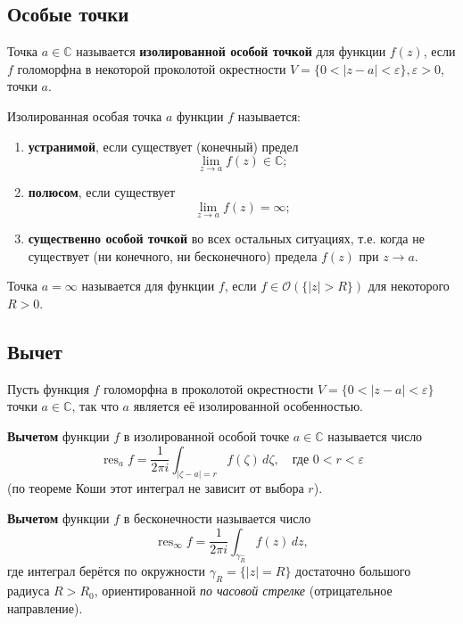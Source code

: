 \subsection{Особые точки}

\begin{definition}
Точка $a \in \mathbb{C}$ называется \textbf{изолированной особой точкой} для функции $f(z)$, если $f$ голоморфна в некоторой проколотой окрестности $V = \{0 < |z - a| < \varepsilon\}, \varepsilon > 0$, точки $a$.

Изолированная особая точка $a$ функции $f$ называется:
\begin{enumerate}
    \item \textbf{устранимой}, если существует (конечный) предел
    \[
    \lim_{z \to a} f(z) \in \mathbb{C};
    \]
    \item \textbf{полюсом}, если существует
    \[
    \lim_{z \to a} f(z) = \infty;
    \]
    \item \textbf{существенно особой точкой} во всех остальных ситуациях, т.е. когда не существует (ни конечного, ни бесконечного) предела $f(z)$ при $z \to a$.
\end{enumerate}
\end{definition}

\begin{definition}
Точка $a = \infty$ называется  для функции $f$, если $f \in \mathcal{O}(\{|z| > R\})$ для некоторого $R > 0$.
\end{definition}

\subsection{Вычет}

Пусть функция $f$ голоморфна в проколотой окрестности $V = \{0 < |z - a| < \varepsilon\}$ точки $a \in \mathbb{C}$, так что $a$ является её изолированной особенностью.

\begin{definition}
\textbf{Вычетом} функции $f$ в изолированной особой точке $a \in \mathbb{C}$ называется число
\[
\operatorname{res}_a f = \frac{1}{2\pi i} \int_{|\zeta - a| = r} f(\zeta) \, d\zeta, \quad \text{где } 0 < r < \varepsilon
\]
(по теореме Коши этот интеграл не зависит от выбора $r$).
\end{definition}

\begin{definition}
\textbf{Вычетом} функции $f$ в бесконечности называется число
\[
\operatorname{res}_{\infty} f = \frac{1}{2\pi i} \int_{\gamma_R^{-}} f(z) \, dz,
\]
где интеграл берётся по окружности $\gamma_R = \{ |z| = R \}$ достаточно большого радиуса $R > R_0$, ориентированной \emph{по часовой стрелке} (отрицательное направление).
\end{definition}

